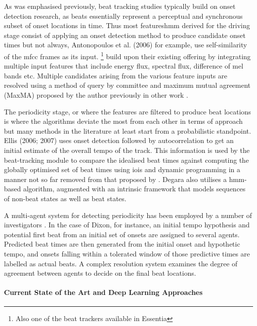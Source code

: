 {As was emphasised previously, beat tracking studies typically build on onset detection research, as beats essentially represent a perceptual and synchronous subset of onset locations in time. Thus most features\acrshort{hmm} derived for the driving stage consist of applying an onset detection method to produce candidate onset times \citep{Brossier2006, Dixon2006, Ellis2007a, Degara2012, Zapata2014} but not always,   Antonopoulos et al. (2006) for example, use self-similarity of the \acrshort{mfcc} frames as its input. \cite{Degara2012}\footnote{Also one of the beat trackers available in Essentia} build upon their existing offering by integrating multiple input features that include energy flux, spectral flux, difference of mel bands etc. Multiple candidates arising from the various feature inputs are resolved using a method of query by committee and maximum mutual agreement (MaxMA) proposed by the author previously in other work \citep{Zapata2012, Zapata2014}.

The periodicity stage, or where the features are filtered to produce beat locations is where the algorithms deviate the most from each other in terms of approach but many methods in the literature at least start from a probabilistic standpoint. Ellis (2006; 2007) uses onset detection followed by autocorrelation to get an initial estimate of the overall tempo of the track. This information is used by the beat-tracking module to compare the idealised beat times against computing the globally optimised set of beat times using \acrshort{ioi}s and dynamic programming in a manner not so far removed from that proposed by \cite{Alonso2007}. Degara also utilises a \acrshort{hmm}-based algorithm, augmented with an intrinsic framework that models sequences of non-beat states as well as beat states.

A multi-agent system for detecting periodicity has been employed by a number of investigators \citep{Goto2001a, Dixon2007, Oliveira2012}. In the case of Dixon, for instance, an initial tempo hypothesis and potential first beat from an initial set of onsets are assigned to several agents. Predicted beat times are then generated from the initial onset and hypothetic tempo, and onsets falling within a tolerated window of those predictive times are labelled as actual beats. A complex resolution system examines the degree of agreement between agents to decide on the final beat locations.

\paragraph{Current State of the Art and Deep Learning Approaches}

}
